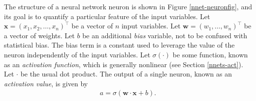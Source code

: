 The structure of a neural network neuron is shown in Figure \ref{nnet-neuronfig}, and its goal is to quantify a particular feature of the input variables. Let ${\mathbf{x} = (x_1, x_2, \ldots, x_n)^\intercal}$ be a vector of $n$ input variables. Let $\mathbf{w} = (w_1, \ldots, w_n)^\intercal$ be a vector of weights. Let $b$ be an additional \textit{bias} variable, not to be confused with statistical bias. The bias term is a constant used to leverage the value of the neuron independently of the input variables. Let $\sigma(\cdot)$ be some function, known as an \textit{activation function}, which is generally nonlinear (see Section \ref{nnets-act}). Let $\cdot$ be the usual dot product. The output of a single neuron, known as an \textit{activation value}, is given by
\begin{align*}
	a = \sigma(\mathbf{w}\cdot\mathbf{x} + b).
\end{align*}

